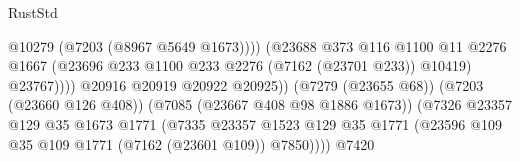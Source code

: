 \begin{lexlean}{RustStd}
\begin{coremodule}
                                                          @10279
                                                          (@7203 (@8967 @5649 @1673))))
                                                      (@23688
                                                        @373
                                                        @116
                                                        @1100
                                                        @11
                                                        @2276
                                                        @1667
                                                        (@23696
                                                          @233
                                                          @1100
                                                          @233
                                                          @2276
                                                          (@7162 (@23701 @233))
                                                          @10419)
                                                        @23767))))
                                                @20916
                                                @20919
                                                @20922
                                                @20925))
                                            (@7279 (@23655 @68))
                                            (@7203 (@23660 @126 @408))
                                            (@7085 (@23667 @408 @98 @1886 @1673))
                                            (@7326
                                              @23357
                                              @129
                                              @35
                                              @1673
                                              @1771
                                              (@7335
                                                @23357
                                                @1523
                                                @129
                                                @35
                                                @1771
                                                (@23596
                                                  @109
                                                  @35
                                                  @109
                                                  @1771
                                                  (@7162 (@23601 @109))
                                                  @7850))))
                                          @7420

\end{coremodule}
\end{lexlean}
